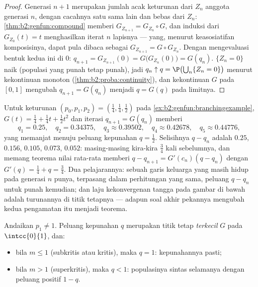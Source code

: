\begin{proof}
Generasi $n + 1$ merupakan jumlah acak keturunan dari $Z_n$
anggota generasi $n$, dengan cacahnya  satu sama lain
dan bebas dari $Z_n$: \cref{thm:b2:genfun:compound} memberi $G_{Z_{n+1}} =
G_{Z_n} \circ G$, dan induksi dari $G_{Z_0}(t) = t$ menghasilkan
iterat $n$ lapisnya --- yang, menurut keasosiatifan komposisinya, dapat
pula dibaca sebagai $G_{Z_{n+1}} = G \circ G_{Z_n}$. Dengan mengevaluasi
bentuk kedua ini di $0$: $q_{n+1} = G_{Z_{n+1}}(0) =
G\bigl(G_{Z_n}(0)\bigr) = G(q_n)$.  $\{Z_n = 0\}$ naik (populasi yang punah tetap
punah), jadi $q_n \uparrow q = \P\bigl(\bigcup_n\{Z_n = 0\}\bigr)$
menurut kekontinuan monoton (\cref{thm:b2:proba:continuity}), dan
kekontinuan $G$ pada $[0, 1]$ mengubah $q_{n+1} = G(q_n)$ menjadi $q =
G(q)$ pada limitnya.
\end{proof}

\begin{example}
\label{ex:b2:genfun:cobwebnumerics}
Untuk  keturunan $(p_0, p_1, p_2) = (\tfrac14,
\tfrac14, \tfrac12)$ pada \cref{ex:b2:genfun:branchingexample},
$G(t) = \tfrac14 + \tfrac14t + \tfrac12t^2$ dan iterasi
$q_{n+1} = G(q_n)$ memberi
\[
q_1 = 0.25, \quad q_2 = 0.34375, \quad q_3 \approx 0.39502,
\quad q_4 \approx 0.42678, \quad q_5 \approx 0.44776,
\]
yang memanjat menuju peluang kepunahan $q = \tfrac12$.
Selisihnya $q - q_n$ adalah $0.25$, $0.156$, $0.105$, $0.073$,
$0.052$: masing-masing kira-kira $\tfrac34$ kali sebelumnya, dan
memang teorema nilai rata-rata memberi $q - q_{n+1} = G'(c_n)(q
- q_n)$ dengan $G'(q) = \tfrac14 + q = \tfrac34$. Dua pelajarannya: sebuah
garis keluarga yang masih hidup pada generasi $n$ punya, terpasang dalam
perhitungan yang sama, peluang $q - q_n$ untuk punah
kemudian; dan laju kekonvergenan tangga pada
gambar di bawah adalah turunannya di titik tetapnya --- adapun
soal akhir pekannya mengubah kedua pengamatan itu menjadi teorema.
\end{example}

\begin{theorem}\label{thm:b2:genfun:extinction}
Andaikan $p_1 \neq 1$. Peluang kepunahan $q$ merupakan titik tetap
\emph{terkecil} $G$ pada $\intcc{0}{1}$, dan:
\begin{itemize}
\item bila $m \leq 1$ (subkritis atau kritis), maka $q = 1$: kepunahannya
pasti;
\item bila $m > 1$ (superkritis), maka $q < 1$: populasinya sintas
selamanya dengan peluang positif $1 - q$.
\end{itemize}
\end{theorem}

